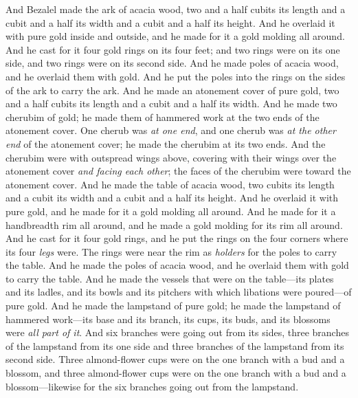 \begin{biblechapter} %
 And Bezalel made the ark of acacia wood, two and a half cubits its length and a cubit and a half its width and a cubit and a half its height.
\verse And he overlaid it with pure gold inside and outside, and he made for it a gold molding all around.
\verse And he cast for it four gold rings on its four feet; and two rings were on its one side, and two rings were on its second side.
\verse And he made poles of acacia wood, and he overlaid them with gold.
\verse And he put the poles into the rings on the sides of the ark to carry the ark.
\verse And he made an atonement cover of pure gold, two and a half cubits its length and a cubit and a half its width.
\verse And he made two cherubim of gold; he made them of hammered work at the two ends of the atonement cover.
\verse One cherub was \textit{at one end}, and one cherub was \textit{at the other end} of the atonement cover; he made the cherubim at its two ends.
\verse And the cherubim were with outspread wings above, covering with their wings over the atonement cover \textit{and facing each other}; the faces of the cherubim were toward the atonement cover.
 And he made the table of acacia wood, two cubits its length and a cubit its width and a cubit and a half its height.
\verse And he overlaid it with pure gold, and he made for it a gold molding all around.
\verse And he made for it a handbreadth rim all around, and he made a gold molding for its rim all around.
\verse And he cast for it four gold rings, and he put the rings on the four corners where its four \textit{legs} were.
\verse The rings were near the rim as \textit{holders} for the poles to carry the table.
\verse And he made the poles of acacia wood, and he overlaid them with gold to carry the table.
\verse And he made the vessels that were on the table—its plates and its ladles, and its bowls and its pitchers with which libations were poured—of pure gold.
\verse And he made the lampstand of pure gold; he made the lampstand of hammered work—its base and its branch, its cups, its buds, and its blossoms were \textit{all part of it}.
\verse And six branches were going out from its sides, three branches of the lampstand from its one side and three branches of the lampstand from its second side.
\verse Three almond-flower cups were on the one branch with a bud and a blossom, and three almond-flower cups were on the one branch with a bud and a blossom—likewise for the six branches going out from the lampstand.

\end{biblechapter}
